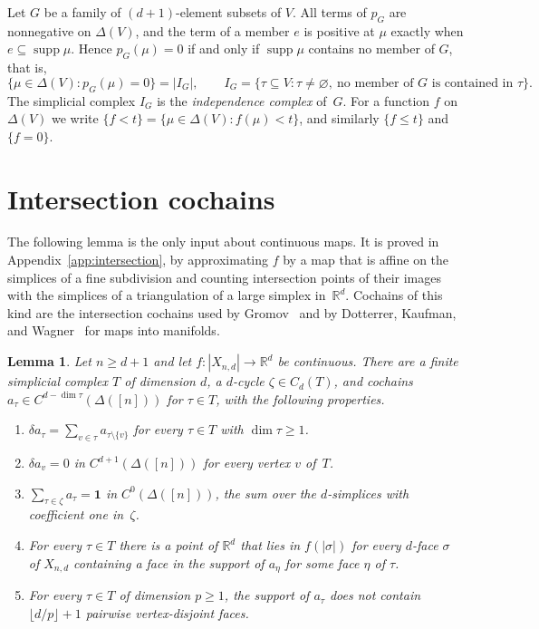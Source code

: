 \documentclass[11pt]{article}
\newtheorem{lemma}[theorem]{Lemma}
\theoremstyle{definition}
\numberwithin{equation}{section}
\newcommand{\one}{\boldsymbol 1}
\newcommand{\R}{\mathbb R}
\DeclareMathOperator{\supp}{supp}
\begin{document}
Let $G$ be a family of $(d+1)$-element subsets of $V$. All terms of $p_G$ are nonnegative on $\Delta(V)$, and the term of a member $e$ is positive at $\mu$ exactly when $e\subseteq\supp\mu$. Hence $p_G(\mu)=0$ if and only if $\supp\mu$ contains no member of $G$, that is,
\begin{equation}\label{eq:independence}
 \{\mu\in\Delta(V):p_G(\mu)=0\}=|I_G|,\qquad I_G=\{\tau\subseteq V:\tau\ne\varnothing,\ \text{no member of $G$ is contained in }\tau\}.
\end{equation}
The simplicial complex $I_G$ is the \emph{independence complex} of~$G$. For a function $f$ on $\Delta(V)$ we write $\{f<t\}=\{\mu\in\Delta(V):f(\mu)<t\}$, and similarly $\{f\le t\}$ and $\{f=0\}$.

\section{Intersection cochains}\label{sec:intersection}

The following lemma is the only input about continuous maps. It is proved in Appendix~\ref{app:intersection}, by approximating $f$ by a map that is affine on the simplices of a fine subdivision and counting intersection points of their images with the simplices of a triangulation of a large simplex in~$\R^d$. Cochains of this kind are the intersection cochains used by Gromov~\cite[\S2.2]{Gromov} and by Dotterrer, Kaufman, and Wagner~\cite[Definition~15 and Lemma~16]{DKW} for maps into manifolds.

\begin{lemma}\label{lem:intersection}
Let $n\ge d+1$ and let $f:|X_{n,d}|\to\R^d$ be continuous. There are a finite simplicial complex $T$ of dimension $d$, a $d$-cycle $\zeta\in C_d(T)$, and cochains $a_\tau\in C^{d-\dim\tau}(\Delta([n]))$ for $\tau\in T$, with the following properties.
\begin{enumerate}[label=\textup{(\alph*)}]
\item\label{I:bd} $\delta a_\tau=\sum_{v\in\tau}a_{\tau\setminus\{v\}}$ for every $\tau\in T$ with $\dim\tau\ge1$.
\item\label{I:vert} $\delta a_v=0$ in $C^{d+1}(\Delta([n]))$ for every vertex $v$ of~$T$.
\item\label{I:top} $\sum_{\tau\in\zeta}a_\tau=\one$ in $C^0(\Delta([n]))$, the sum over the $d$-simplices with coefficient one in~$\zeta$.
\item\label{I:ov} For every $\tau\in T$ there is a point of $\R^d$ that lies in $f(|\sigma|)$ for every $d$-face $\sigma$ of $X_{n,d}$ containing a face in the support of $a_\eta$ for some face $\eta$ of $\tau$.
\item\label{I:gp} For every $\tau\in T$ of dimension $p\ge1$, the support of $a_\tau$ does not contain $\lfloor d/p\rfloor+1$ pairwise vertex-disjoint faces.
\end{enumerate}
\end{lemma}
\end{document}
